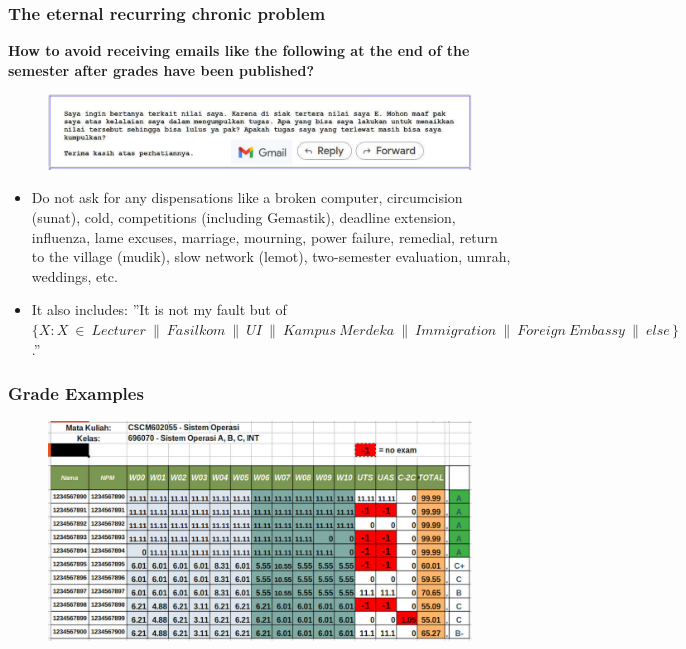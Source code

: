 \documentclass[aspectratio=169, xcolor=table, notheorems, hyperref={pdfpagelabels=false}]{beamer}
\begin{document}
\begin{frame}[fragile]
\frametitle{The eternal recurring chronic problem} 

\textbf{How to avoid receiving emails like the following at the end of the semester after grades have 
        been published?}

\begin{figure}
\includegraphics[width=1.01\linewidth]{os-appeal}
\end{figure}

\begin{itemize}
\item Do not ask for any dispensations like a broken computer, circumcision (sunat), cold, competitions
      (including Gemastik), deadline extension, influenza, lame excuses, marriage, mourning,
      power failure, remedial, return to the village (mudik), slow network (lemot), two-semester evaluation, umrah,
      weddings, etc.
\item It also includes: ''It is not my fault but of $\{ X\!: X\ \in\ Lecturer\ \parallel\ Fasilkom\
      \parallel\ UI\ \parallel\ Kampus\ Merdeka\ \parallel\ Immigration\ \parallel\ Foreign\ Embassy\ \parallel\
      else\, \}$.''
\end{itemize}

\end{frame}

\begin{frame}[fragile]
\frametitle{Grade Examples}

\begin{figure}
\includegraphics[width=0.94\linewidth]{os-siak}
\end{figure}

\end{frame}
\end{document}
